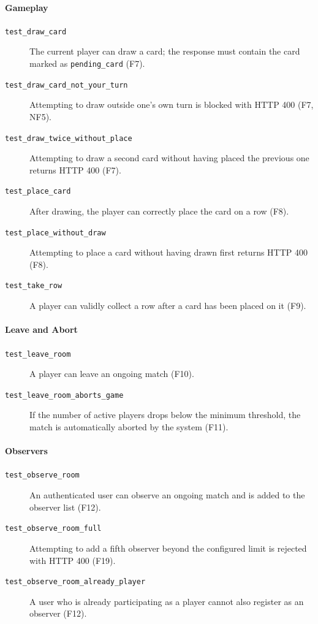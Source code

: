 \documentclass{scrartcl}
\begin{document}
\paragraph{Gameplay}
\begin{description}
  \item[\texttt{test\_draw\_card}] The current player can draw a card; the
  response must contain the card marked as \texttt{pending\_card} (F7).

  \item[\texttt{test\_draw\_card\_not\_your\_turn}] Attempting to draw outside
  one's own turn is blocked with HTTP 400 (F7, NF5).

  \item[\texttt{test\_draw\_twice\_without\_place}] Attempting to draw a second
  card without having placed the previous one returns HTTP 400 (F7).

  \item[\texttt{test\_place\_card}] After drawing, the player can correctly
  place the card on a row (F8).

  \item[\texttt{test\_place\_without\_draw}] Attempting to place a card
  without having drawn first returns HTTP 400 (F8).

  \item[\texttt{test\_take\_row}] A player can validly collect a row after
  a card has been placed on it (F9).
\end{description}

\paragraph{Leave and Abort}
\begin{description}
  \item[\texttt{test\_leave\_room}] A player can leave an ongoing match (F10).

  \item[\texttt{test\_leave\_room\_aborts\_game}] If the number of active
  players drops below the minimum threshold, the match is automatically
  aborted by the system (F11).
\end{description}

\paragraph{Observers}
\begin{description}
  \item[\texttt{test\_observe\_room}] An authenticated user can observe an
  ongoing match and is added to the observer list (F12).

  \item[\texttt{test\_observe\_room\_full}] Attempting to add a fifth observer
  beyond the configured limit is rejected with HTTP 400 (F19).

  \item[\texttt{test\_observe\_room\_already\_player}] A user who is already
  participating as a player cannot also register as an observer (F12).
\end{description}
\end{document}
